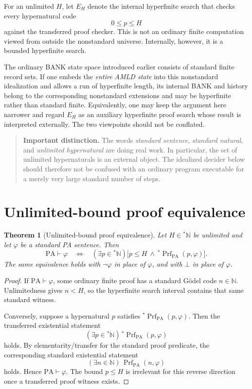 \documentclass[11pt,openany]{book}
\newtheorem{theorem}{Theorem}[chapter]
\theoremstyle{definition}
\theoremstyle{remark}
\newenvironment{warningbox}{\begin{quote}\small\color{red!50!black}\textbf{Important distinction.} }{\end{quote}}
\newcommand{\N}{\mathbb{N}}
\newcommand{\Prf}{\operatorname{Prf}}
\begin{document}
For an unlimited $H$, let $E_H$ denote the internal hyperfinite search that checks every hypernatural code
\[
0\le p\le H
\]
against the transferred proof checker. This is not an ordinary finite computation viewed from outside the nonstandard universe. Internally, however, it is a bounded hyperfinite search.

The ordinary BANK state space introduced earlier consists of standard finite record sets. If one embeds the \emph{entire AMLD state} into this nonstandard idealization and allows a run of hyperfinite length, its internal BANK and history belong to the corresponding nonstandard extensions and may be hyperfinite rather than standard finite. Equivalently, one may keep the argument here narrower and regard $E_H$ as an auxiliary hyperfinite proof search whose result is interpreted externally. The two viewpoints should not be conflated.

\begin{warningbox}
The words \emph{standard sentence}, \emph{standard natural}, and \emph{unlimited hypernatural} are doing real work. In particular, the set of unlimited hypernaturals is an external object. The idealized decider below should therefore not be confused with an ordinary program executable for a merely very large standard number of steps.
\end{warningbox}

\section{Unlimited-bound proof equivalence}
\begin{theorem}[Unlimited-bound proof equivalence]\label{thm:hyperproofequiv}
Let $H\in{}^*\N$ be unlimited and let $\varphi$ be a standard PA sentence. Then
\[
\mathrm{PA}\vdash\varphi
\quad\Longleftrightarrow\quad
(\exists p\in{}^*\N)\bigl[p\le H\ \wedge\ {}^*\!\Prf_{\mathrm{PA}}(p,\varphi)\bigr].
\]
The same equivalence holds with $\neg\varphi$ in place of $\varphi$, and with $\bot$ in place of $\varphi$.
\end{theorem}
\begin{proof}
If $\mathrm{PA}\vdash\varphi$, some ordinary finite proof has a standard G\"odel code $n\in\N$. Unlimitedness gives $n<H$, so the hyperfinite search interval contains that same standard witness.

Conversely, suppose a hypernatural $p$ satisfies ${}^*\!\Prf_{\mathrm{PA}}(p,\varphi)$. Then the transferred existential statement
\[
(\exists p\in{}^*\N)\,{}^*\!\Prf_{\mathrm{PA}}(p,\varphi)
\]
holds. By elementarity/transfer for the standard proof predicate, the corresponding standard existential statement
\[
(\exists n\in\N)\,\Prf_{\mathrm{PA}}(n,\varphi)
\]
holds. Hence $\mathrm{PA}\vdash\varphi$. The bound $p\le H$ is irrelevant for this reverse direction once a transferred proof witness exists.
\end{proof}
\end{document}
